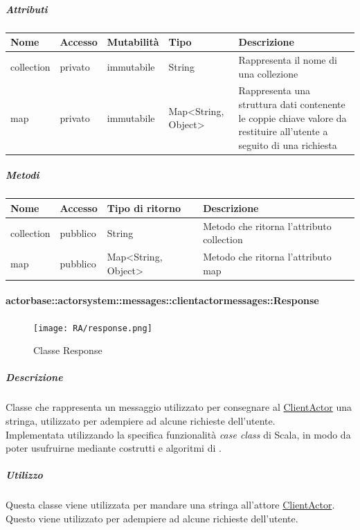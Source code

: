 \documentclass{scalatekids-article}
\begin{document}
\subparagraph{Attributi}
\begin{tabular}{| p{2cm} | p{1.5cm} | p{2cm} | p{3cm} | p{8.5cm} |}
  \hline
  Nome & Accesso & Mutabilità & Tipo & Descrizione\\
  \hline
  collection & privato & immutabile & String & Rappresenta il nome di una collezione\\
  \hline
  map & privato & immutabile & Map<String, Object> & Rappresenta una struttura dati contenente le coppie chiave valore da restituire all'utente a seguito di una richiesta\\
  \hline
\end{tabular}

\subparagraph{Metodi}
\begin{tabular}{| p{3cm} | p{1.5cm} | p{3.5cm} | p{9cm} |}
  \hline
  Nome & Accesso & Tipo di ritorno & Descrizione\\
  \hline
  collection & pubblico & String & Metodo che ritorna l'attributo collection\\
  \hline
  map & pubblico & Map<String, Object> & Metodo che ritorna l'attributo map\\
  \hline
\end{tabular}

\paragraph{actorbase::actorsystem::messages::clientactormessages::Response}
\label{sec:actorbase::actorsystem::messages::clientactormessages::Response}

\begin{figure}[H]
  \begin{center}
    \texttt{[image: RA/response.png]}
    \caption{Classe Response}
  \end{center}
\end{figure}

\subparagraph{Descrizione}
Classe che rappresenta un messaggio utilizzato per consegnare al
\hyperref[sec:actorbase::actorsystem::actors::clientactor::ClientActor]{ClientActor} una stringa, utilizzato per adempiere ad alcune
richieste dell'utente.\\Implementata utilizzando la specifica funzionalità \textit{case class} di Scala,
in modo da poter usufruirne mediante costrutti e algoritmi di
.

\subparagraph{Utilizzo}
Questa classe viene utilizzata per mandare una stringa all'attore
\hyperref[sec:actorbase::actorsystem::actors::clientactor::ClientActor]{ClientActor}.
Questo viene utilizzato per adempiere ad alcune richieste dell'utente.
\end{document}
